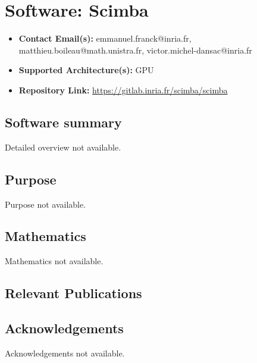 \section{Software: Scimba}
\label{sec:Scimba:software}



\begin{itemize}
    \item \textbf{Contact Email(s):} emmanuel.franck@inria.fr, matthieu.boileau@math.unistra.fr, victor.michel-dansac@inria.fr
    \item \textbf{Supported Architecture(s):} GPU
    \item \textbf{Repository Link:} \href{https://gitlab.inria.fr/scimba/scimba}{https://gitlab.inria.fr/scimba/scimba}
\end{itemize}

\subsection{Software summary}
\label{sec:Scimba:summary}
Detailed overview not available.



\subsection{Purpose}
\label{sec:Scimba:purpose}
Purpose not available.



\subsection{Mathematics}
\label{sec:Scimba:mathematics}
Mathematics not available.


\subsection{Relevant Publications}
\label{sec:Scimba:publications}

\subsection{Acknowledgements}
\label{sec::Scimba:acknowledgements}

Acknowledgements not available.


